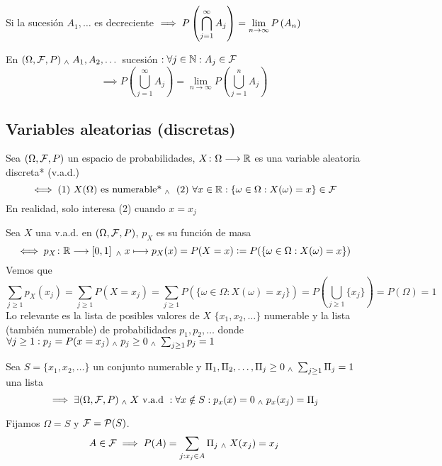 \begin{prop}
	 Si la sucesión $A_1, \dots$ es decreciente
	$\displaystyle\implies P\left(\bigcap_{j=1}^\infty A_j\right)=\lim_{n\rightarrow\infty}P\left(A_n\right)$
\end{prop}

\begin{teo}
	En $(\Omega, \mathcal{F}, P) \; _{\wedge} \; A_1, A_2, \dots$ sucesión $: \forall j \in \mathbb{N} : A_j \in \mathcal{F}$
	\[\implies P\left(\bigcup_{j=1}^\infty A_j\right)=\lim_{n\rightarrow\infty}P\left(\bigcup_{j=1}^n A_j\right)\]
	\begin{dem}
		
	\end{dem}
\end{teo}

\subsection{Variables aleatorias (discretas)}
\begin{defn}
	Sea $(\Omega, \mathcal{F}, P)$ un espacio de probabilidades, $X \colon \Omega \longrightarrow \mathbb{R}$ es una variable aleatoria discreta* (v.a.d.)
	\[\iff \text{(1) } X(\Omega) \text{ es numerable*} \; _{\wedge} \; \text{ (2) }\forall x \in \mathbb{R} : \{\omega \in \Omega : X(\omega)=x\} \in \mathcal{F}\]
	En realidad, solo interesa (2) cuando $x=x_j$
\end{defn}
\begin{defn}
	Sea $X$ una v.a.d. en $(\Omega, \mathcal{F}, P)$, $p_X$ es su función de masa
	\[\iff p_X \colon \mathbb{R} \longrightarrow \left[0,1\right] \; _{\wedge} \; x\longmapsto p_X(x)=P(X=x)\vcentcolon= P(\{\omega \in \Omega : X(\omega)=x\})\]
	Vemos que 
	\[\sum_{j\geq1}p_X(x_j)=\sum_{j\geq1}P(X=x_j)=\sum_{j\geq1} P(\{\omega \in \Omega : X(\omega)=x_j\})=P\left(\bigcup_{j\geq1}\{x_j\}\right)=P(\Omega)=1\]
	Lo relevante es la lista de posibles valores de $X$ $\{x_1, x_2, \dots\}$ numerable y la lista (también numerable) de probabilidades $p_1, p_2, \dots$ donde $\forall j \geq 1 : p_j=P(x=x_j) \; _{\wedge} \; p_j\geq 0 \; _{\wedge} \; \sum_{j\geq 1}p_j=1$
\end{defn}

\begin{teo}
	Sea $S=\{x_1, x_2, \dots \}$ un conjunto numerable y $\Pi_1, \Pi_2, \dots, \Pi_j\geq0 \; _{\wedge} \; \sum_{j\geq 1}\Pi_j=1$ una lista
	\[\implies \exists (\Omega, \mathcal{F}, P) \; _{\wedge} \; X\text{ v.a.d }:\forall  x\notin S :p_x(x)= 0 \; _{\wedge} \; p_x(x_j)=\Pi_j\]
	\begin{dem}
		Fijamos $\Omega = S$ y $\mathcal{F}=\mathcal{P}(S)$.
		\[A\in \mathcal{F} \implies P(A)=\sum_{j:x_j\in A}\Pi_j \; _{\wedge} \; X(x_j)=x_j\]
	\end{dem}
\end{teo}

